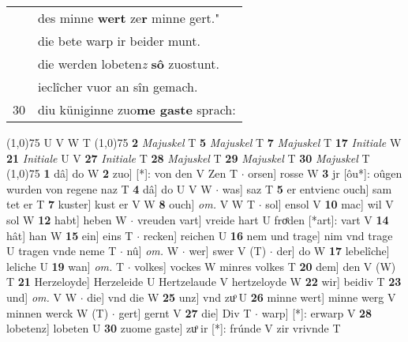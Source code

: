 \documentclass[8pt,a4paper,notitlepage]{article}
\begin{document}
\begin{table}[ht]
\begin{minipage}[t]{0.5\linewidth}
\begin{tabular}{rl}
 & des minne \textbf{wert} ze\textbf{r} minne gert."\\ 
 & die bete warp ir beider munt.\\ 
 & die werden lobeten\textit{z} \textbf{sô} zuostunt.\\ 
 & ieclîcher vuor an sîn gemach.\\ 
30 & diu küniginne zuo\textbf{me gaste} sprach:\\ 
\end{tabular}
\scriptsize
\line(1,0){75} \newline
U V W T \newline
\line(1,0){75} \newline
\textbf{2} \textit{Majuskel} T  \textbf{5} \textit{Majuskel} T  \textbf{7} \textit{Majuskel} T  \textbf{17} \textit{Initiale} W  \textbf{21} \textit{Initiale} U V  \textbf{27} \textit{Initiale} T  \textbf{28} \textit{Majuskel} T  \textbf{29} \textit{Majuskel} T  \textbf{30} \textit{Majuskel} T  \newline
\line(1,0){75} \newline
\textbf{1} dâ] do W \textbf{2} zuo] [*]: von den V Zen T  $\cdot$ orsen] rosse W \textbf{3} jr [ôu*]: oûgen wurden von regene naz T \textbf{4} dâ] do U V W  $\cdot$ was] saz T \textbf{5} er entvienc ouch] sam tet er T \textbf{7} kuster] kust er V W \textbf{8} ouch] \textit{om.} V W T  $\cdot$ sol] ensol V \textbf{10} mac] wil V sol W \textbf{12} habt] heben W  $\cdot$ vreuden vart] vreide hart U froͤden [*art]: vart V \textbf{14} hât] han W \textbf{15} ein] eins T  $\cdot$ recken] reichen U \textbf{16} nem und trage] nim vnd trage U tragen vnde neme T  $\cdot$ nû] \textit{om.} W  $\cdot$ wer] swer V (T)  $\cdot$ der] do W \textbf{17} lebelîche] leliche U \textbf{19} wan] \textit{om.} T  $\cdot$ volkes] vockes W minres volkes T \textbf{20} dem] den V (W) T \textbf{21} Herzeloyde] Herzeleide U Hertzelaude V hertzeloyde W \textbf{22} wir] beidiv T \textbf{23} und] \textit{om.} V W  $\cdot$ die] vnd die W \textbf{25} unz] vnd zuͦ U \textbf{26} minne wert] minne werg V minnen werck W (T)  $\cdot$ gert] gernt V \textbf{27} die] Div T  $\cdot$ warp] [*]: erwarp V \textbf{28} lobetenz] lobeten U \textbf{30} zuome gaste] zuͦ ir [*]: frúnde V zir vrivnde T \newline
\end{minipage}
\end{table}
\end{document}

